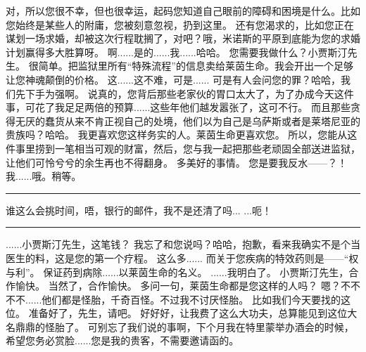 \documentclass[openany]{book}
\begin{document}
\begin{dialogue}
     对，所以您很不幸，但也很幸运，起码您知道自己眼前的障碍和困境是什么。比如您始终是某些人的附庸，您被刻意忽视，扔到这里。
     还有您渴求的，比如您正在谋划一场求婚，却被这次行程耽搁了，对吧？哦，米诺斯的平原到底能为您的求婚计划赢得多大胜算呀。
     啊......是的......我......哈哈。
     您需要我做什么？小贾斯汀先生。
     很简单。把监狱里所有“特殊流程”的信息卖给莱茵生命。我会开出一个足够让您神魂颠倒的价格。
     这......这不难，可是......
     可是有人会问您的罪？哈哈，我们先下手为强啊。
     说真的，您背后那些老家伙的胃口太大了，为了办成今天这件事，可花了我足足两倍的预算......这些年他们越发嚣张了，这可不行。
     而且那些贪得无厌的蠢货从来不肯正视自己的处境，他们以为自己是乌萨斯或者是莱塔尼亚的贵族吗？哈哈。
     我更喜欢您这样务实的人。莱茵生命更喜欢您。
     所以，您能从这件事里捞到一笔相当可观的财富，然后，您与我一起把那些老顽固全部送进监狱，让他们可怜兮兮的余生再也不得翻身。
     多美好的事情。
     您是要我反水——？！
     我......哦。稍等。
    \par\noindent\rule{\textwidth}{0.4pt}
     谁这么会挑时间，唔，银行的邮件，我不是还清了吗...
     ...呃！
    \par\noindent\rule{\textwidth}{0.4pt}
     ......小贾斯汀先生，这笔钱？
     我忘了和您说吗？哈哈，抱歉，看来我确实不是个当医生的料，这是您的第一个疗程。
     这么多......
     而关于您疾病的特效药则是——“权与利”。
     保证药到病除......以莱茵生命的名义。
     ......我明白了。
     小贾斯汀先生，合作愉快。
     当然了，合作愉快。
     多问一句，莱茵生命都是您这样的人吗？
     嗯？不不不不......他们都是怪胎，千奇百怪。不过我不讨厌怪胎。
     比如我们今天要找的这位。
     准备好了，先生，请吧。
     好好好，让我费了这么大功夫，总算能见到这位大名鼎鼎的怪胎了。
     可别忘了我们说的事啊，下个月我在特里蒙举办酒会的时候，希望您务必赏脸......您是我的贵客，不需要邀请函的。
\end{dialogue}
\clearpage
\end{document}
